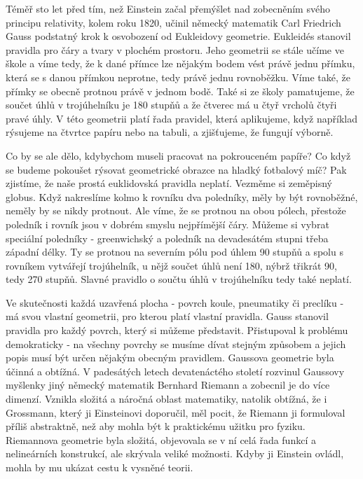   Téměř sto let před tím, než Einstein začal přemýšlet nad zobecněním svého principu relativity,
  kolem roku 1820, učinil německý matematik Carl Friedrich Gauss podstatný krok k osvobození od
  Eukleidovy geometrie. Eukleidés stanovil pravidla pro čáry a tvary v plochém prostoru. Jeho
  geometrii se stále učíme ve škole a víme tedy, že k dané přímce lze nějakým bodem vést právě jednu
  přímku, která se s danou přímkou neprotne, tedy právě jednu rovnoběžku. Víme také, že přímky se
  obecně protnou právě v jednom bodě. Také si ze školy pamatujeme, že součet úhlů v trojúhelníku je
  180 stupňů a že čtverec má u čtyř vrcholů čtyři pravé úhly. V této geometrii platí řada pravidel,
  která aplikujeme, když například rýsujeme na čtvrtce papíru nebo na tabuli, a zjišťujeme, že
  fungují výborně. 
  
  Co by se ale dělo, kdybychom museli pracovat na pokrouceném papíře? Co když se budeme pokoušet
  rýsovat geometrické obrazce na hladký fotbalový míč? Pak zjistíme, že naše prostá euklidovská
  pravidla neplatí. Vezměme si zeměpisný globus. Když nakreslíme kolmo k rovníku dva poledníky, měly
  by být rovnoběžné, neměly by se nikdy protnout. Ale víme, že se protnou na obou pólech, přestože
  poledník i rovník jsou v dobrém smyslu nejpřímější čáry. Můžeme si vybrat speciální poledníky -
  greenwichský a poledník na devadesátém stupni třeba západní délky. Ty se protnou na severním pólu
  pod úhlem 90 stupňů a spolu s rovníkem vytvářejí trojúhelník, u nějž součet úhlů není 180, nýbrž
  třikrát 90, tedy 270 stupňů. Slavné pravidlo o součtu úhlů v trojúhelníku tedy také neplatí. 
  
  Ve skutečnosti každá uzavřená plocha - povrch koule, pneumatiky či preclíku - má svou vlastní
  geometrii, pro kterou platí vlastní pravidla. Gauss stanovil pravidla pro každý povrch, který si
  můžeme představit. Přistupoval k problému demokraticky - na všechny povrchy se musíme dívat
  stejným způsobem a jejich popis musí být určen nějakým obecným pravidlem. Gaussova geometrie byla
  účinná a obtížná. V padesátých letech devatenáctého století rozvinul Gaussovy myšlenky jiný
  německý matematik Bernhard Riemann a zobecnil je do více dimenzí. Vznikla složitá a náročná oblast
  matematiky, natolik obtížná, že i Grossmann, který ji Einsteinovi doporučil, měl pocit, že Riemann
  ji formuloval příliš abstraktně, než aby mohla být k praktickému užitku pro fyziku. Riemannova
  geometrie byla složitá, objevovala se v ní celá řada funkcí a nelineárních konstrukcí, ale
  skrývala veliké možnosti. Kdyby ji Einstein ovládl, mohla by mu ukázat cestu k vysněné teorii.
  
